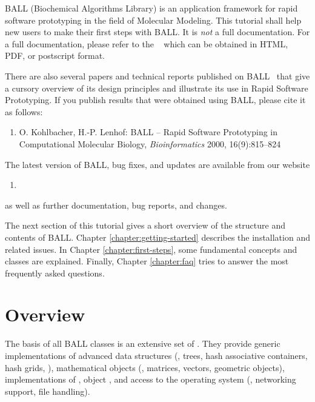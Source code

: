 BALL (Biochemical Algorithms Library) is an application framework for rapid
software prototyping in the field of Molecular Modeling.  This tutorial shall
help new users to make their first steps with BALL. It is {\em not} a full
documentation. For a full documentation, please refer to the ~\cite{BALL-RM} which can be obtained in HTML, PDF, or postscript format.

There are also several papers and technical reports published on
BALL~\cite{BKL2000,BKL99a,BKL99b,KL99,Koh2000} that give a cursory overview 
of its design principles and illustrate its use in Rapid Software Prototyping. If you
publish results that were obtained using BALL, please cite it as follows:
\begin{enumerate}
	\item[] O. Kohlbacher, H.-P. Lenhof: BALL -- Rapid Software Prototyping
  in Computational Molecular Biology, {\em Bioinformatics} 2000,
	16(9):815--824
\end{enumerate}

\noindent
The latest version of BALL, bug fixes, and updates are available from our website

\begin{enumerate}
  \item[] 
\end{enumerate}

\noindent 
as well as further documentation, bug reports, and changes.

The next section of this tutorial gives a short overview of the structure and
contents of BALL. Chapter \ref{chapter:getting-started} describes the
installation and related issues. In Chapter \ref{chapter:first-steps}, some
fundamental concepts and classes are explained. Finally, Chapter
\ref{chapter:faq} tries to answer the most frequently asked questions.

\section{Overview}


The basis of all BALL classes is an extensive set of .  They provide generic implementations of advanced data structures
(\eg, trees, hash associative containers, hash grids, \etc), mathematical
objects (\eg, matrices, vectors, geometric objects), implementations of
, object , and access to the
operating system (\eg, networking support, file handling).

